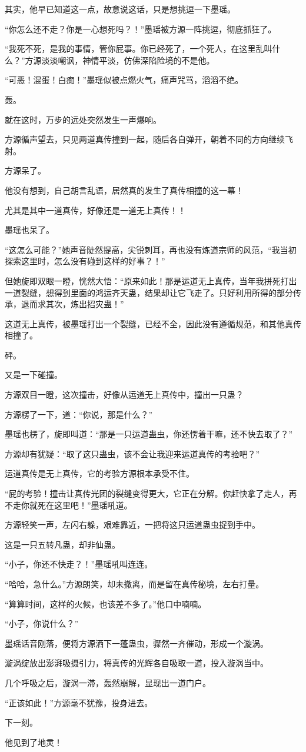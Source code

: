 \begin{this_body}
其实，他早已知道这一点，故意说这话，只是想挑逗一下墨瑶。

“你怎么还不走？你是一心想死吗？！”墨瑶被方源一阵挑逗，彻底抓狂了。

“我死不死，是我的事情，管你屁事。你已经死了，一个死人，在这里乱叫什么？”方源淡淡嘲讽，神情平淡，仿佛深陷险境的不是他。

“可恶！混蛋！白痴！”墨瑶似被点燃火气，痛声咒骂，滔滔不绝。

轰。

就在这时，万步的远处突然发生一声爆响。

方源循声望去，只见两道真传撞到一起，随后各自弹开，朝着不同的方向继续飞射。

方源呆了。

他没有想到，自己胡言乱语，居然真的发生了真传相撞的这一幕！

尤其是其中一道真传，好像还是一道无上真传！！

墨瑶也呆了。

“这怎么可能？”她声音陡然提高，尖锐刺耳，再也没有炼道宗师的风范，“我当初探索这里时，怎么没有碰到这样的好事？！”

但她旋即双眼一瞪，恍然大悟：“原来如此！那是运道无上真传，当年我拼死打出一道裂缝，想得到里面的鸿运齐天蛊，结果却让它飞走了。只好利用所得的部分传承，退而求其次，炼出招灾蛊！”

这道无上真传，被墨瑶打出一个裂缝，已经不全，因此没有遵循规范，和其他真传相撞了。

砰。

又是一下碰撞。

方源双目一瞪，这次撞击，好像从运道无上真传中，撞出一只蛊？

方源楞了一下，道：“你说，那是什么？”

墨瑶也楞了，旋即叫道：“那是一只运道蛊虫，你还愣着干嘛，还不快去取了？”

方源却有犹疑：“取了这只蛊虫，该不会让我迎来运道真传的考验吧？”

运道真传是无上真传，它的考验方源根本承受不住。

“屁的考验！撞击让真传光团的裂缝变得更大，它正在分解。你赶快拿了走人，再不走你就死在这里吧！”墨瑶吼道。

方源轻笑一声，左闪右躲，艰难靠近，一把将这只运道蛊虫捉到手中。

这是一只五转凡蛊，却非仙蛊。

“小子，你还不快走？！”墨瑶吼叫连连。

“哈哈，急什么。”方源朗笑，却未撤离，而是留在真传秘境，左右打量。

“算算时间，这样的火候，也该差不多了。”他口中喃喃。

“小子，你说什么？”

墨瑶话音刚落，便将方源洒下一蓬蛊虫，骤然一齐催动，形成一个漩涡。

漩涡绽放出澎湃吸摄引力，将真传的光辉各自吸取一道，投入漩涡当中。

几个呼吸之后，漩涡一滞，轰然崩解，显现出一道门户。

“正该如此！”方源毫不犹豫，投身进去。

下一刻。

他见到了地灵！

\end{this_body}

